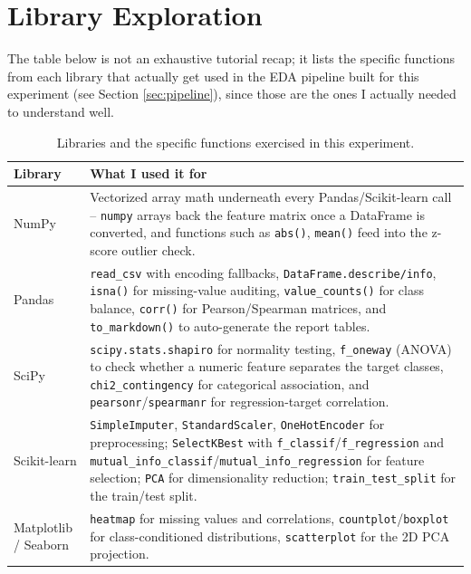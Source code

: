 \documentclass[11pt,a4paper]{article}
\begin{document}
\section{Library Exploration}
The table below is not an exhaustive tutorial recap; it lists the specific functions from each library that actually get used in the EDA pipeline built for this experiment (see Section \ref{sec:pipeline}), since those are the ones I actually needed to understand well.

\begin{table}[h]
\centering
\begin{tabular}{@{}p{2.4cm}p{11.5cm}@{}}
\toprule
\textbf{Library} & \textbf{What I used it for} \\
\midrule
NumPy & Vectorized array math underneath every Pandas/Scikit-learn call -- \texttt{numpy} arrays back the feature matrix once a DataFrame is converted, and functions such as \texttt{abs()}, \texttt{mean()} feed into the z-score outlier check. \\
Pandas & \texttt{read\_csv} with encoding fallbacks, \texttt{DataFrame.describe/info}, \texttt{isna()} for missing-value auditing, \texttt{value\_counts()} for class balance, \texttt{corr()} for Pearson/Spearman matrices, and \texttt{to\_markdown()} to auto-generate the report tables. \\
SciPy & \texttt{scipy.stats.shapiro} for normality testing, \texttt{f\_oneway} (ANOVA) to check whether a numeric feature separates the target classes, \texttt{chi2\_contingency} for categorical association, and \texttt{pearsonr}/\texttt{spearmanr} for regression-target correlation. \\
Scikit-learn & \texttt{SimpleImputer}, \texttt{StandardScaler}, \texttt{OneHotEncoder} for preprocessing; \texttt{SelectKBest} with \texttt{f\_classif}/\texttt{f\_regression} and \texttt{mutual\_info\_classif}/\texttt{mutual\_info\_regression} for feature selection; \texttt{PCA} for dimensionality reduction; \texttt{train\_test\_split} for the train/test split. \\
Matplotlib / Seaborn & \texttt{heatmap} for missing values and correlations, \texttt{countplot}/\texttt{boxplot} for class-conditioned distributions, \texttt{scatterplot} for the 2D PCA projection. \\
\bottomrule
\end{tabular}
\caption{Libraries and the specific functions exercised in this experiment.}
\end{table}
\end{document}
